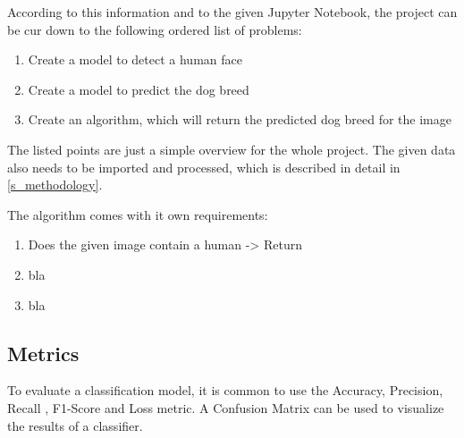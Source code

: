 \documentclass{article}
\begin{document}
According to this information and to the given Jupyter Notebook, the project can be cur down to the following ordered list of problems:
\begin{enumerate}
	\item Create a model to detect a human face
	\item Create a model to predict the dog breed
	\item Create an algorithm, which will return the predicted dog breed for the image
\end{enumerate}
The listed points are just a simple overview for the whole project. The given data also needs to be imported and processed, which is described in detail in \ref{s_methodology}.\newline

The algorithm comes with it own requirements:
\begin{enumerate}
	\item Does the given image contain a human -> Return
	\item bla
	\item bla
\end{enumerate}

\subsection{Metrics}
To evaluate a classification model, it is common to use the Accuracy, Precision, Recall , F1-Score and Loss metric. A Confusion Matrix can be used to visualize the results of a classifier.\newline
\end{document}
